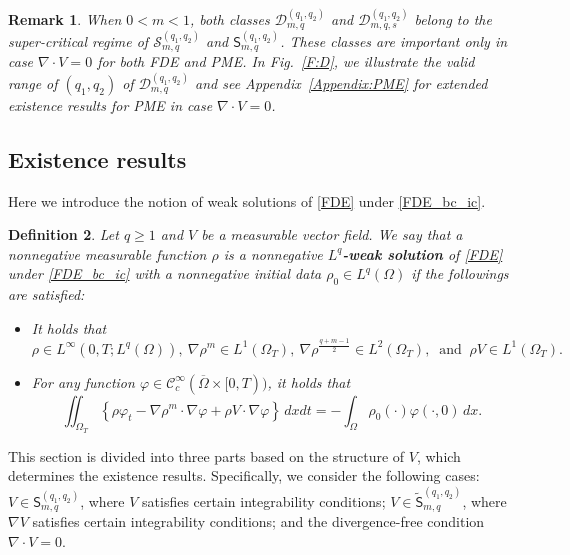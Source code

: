 \documentclass{amsart}
\newtheorem{defn}{Definition}[section]
\newtheorem{remark}[defn]{Remark}
\numberwithin{equation}{section}
\begin{document}
\begin{remark}
When $0<m<1$, both classes $\mathcal{D}_{m,q}^{(q_1,q_2)}$ and $\mathcal{D}_{m,q,s}^{(q_1,q_2)}$ belong to the super-critical regime of $\mathcal{S}_{m,q}^{(q_1,q_2)}$ and $\mathsf{S}_{m,q}^{(q_1,q_2)}$. These classes are important only in case $\nabla \cdot V = 0$ for both FDE and PME. In Fig.~\ref{F:D}, we illustrate the valid range of $(q_1,q_2)$ of $\mathcal{D}_{m,q}^{(q_1,q_2)}$ and see Appendix~\ref{Appendix:PME} for extended existence results for PME in case $\nabla \cdot V = 0$.  
\end{remark}	


    

\subsection{Existence results}\label{SS:Existence}


Here we introduce the notion of weak solutions of \eqref{FDE} under \eqref{FDE_bc_ic}.


\begin{defn}\label{D:weak-sol}
Let $q\geq 1$ and $V$ be a measurable vector field.
We say that a nonnegative measurable function $\rho$ is
a nonnegative \textbf{$L^q$-weak solution} of \eqref{FDE} under \eqref{FDE_bc_ic} with a nonnegative initial data $\rho_0 \in L^{q}(\Omega)$ if the followings are satisfied:
\begin{itemize}
\item[(i)] It holds that
\[
\rho \in L^{\infty}\left(0, T; L^q (\Omega)\right),
\ \nabla \rho^m \in L^{1}(\Omega_T), 
\ \nabla \rho^{\frac{q+m-1}{2}} \in L^{2}(\Omega_T), 
\ \text{ and } \ \rho V \in L^{1}(\Omega_T).
\]
\item[(ii)] For any function $\varphi \in {\mathcal{C}}^\infty_c (\overline{\Omega} \times [0,T))$, it holds that
\begin{equation*}\label{KK-May7-40}
\iint_{\Omega_T} \left\{ \rho \varphi_t - \nabla \rho^m \cdot \nabla \varphi + \rho V \cdot \nabla \varphi \right\} \,dx dt = -\int_{\Omega} \rho_{0} (\cdot) \varphi(\cdot, 0) \,dx.
\end{equation*}
\end{itemize}
\end{defn}


This section is divided into three parts based on the structure of \( V \), which determines the existence results. Specifically, we consider the following cases: \( V \in \mathsf{S}_{m,q}^{(q_1, q_2)} \), where \( V \) satisfies certain integrability conditions; \( V \in \tilde{\mathsf{S}}_{m,q}^{(q_1, q_2)} \), where \( \nabla V \) satisfies certain integrability conditions; and the divergence-free condition \( \nabla \cdot V = 0 \).
\end{document}
